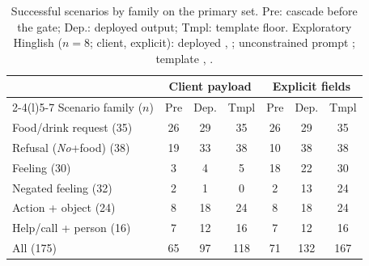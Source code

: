 \begin{table}[t]
\centering\footnotesize
\setlength{\tabcolsep}{2.6pt}
\begin{tabular}{@{}lcccccc@{}}
\toprule
 & \multicolumn{3}{c}{Client payload} & \multicolumn{3}{c}{Explicit fields} \\
\cmidrule(lr){2-4}\cmidrule(l){5-7}
Scenario family ($n$) & Pre & Dep. & Tmpl & Pre & Dep. & Tmpl \\
\midrule
Food/drink request (35) & 26 & 29 & 35 & 26 & 29 & 35 \\
Refusal (\emph{No}+food) (38) & 19 & 33 & 38 & 10 & 38 & 38 \\
Feeling (30) & 3 & 4 & 5 & 18 & 22 & 30 \\
Negated feeling (32) & 2 & 1 & 0 & 2 & 13 & 24 \\
Action + object (24) & 8 & 18 & 24 & 8 & 18 & 24 \\
Help/call + person (16) & 7 & 12 & 16 & 7 & 12 & 16 \\
\midrule
All (175) & 65 & 97 & 118 & 71 & 132 & 167 \\
\bottomrule
\end{tabular}
\caption{Successful scenarios by family on the primary set. Pre: cascade before the gate; Dep.: deployed output; Tmpl: template floor. Exploratory Hinglish ($n=8$; client, explicit): deployed \CMSuccDepU{}, \CMSuccDepS{}; unconstrained prompt \CMSuccNaive{}; template \CMSuccTmplU{}, \CMSuccTmplS{}.}
\label{tab:type}
\end{table}
